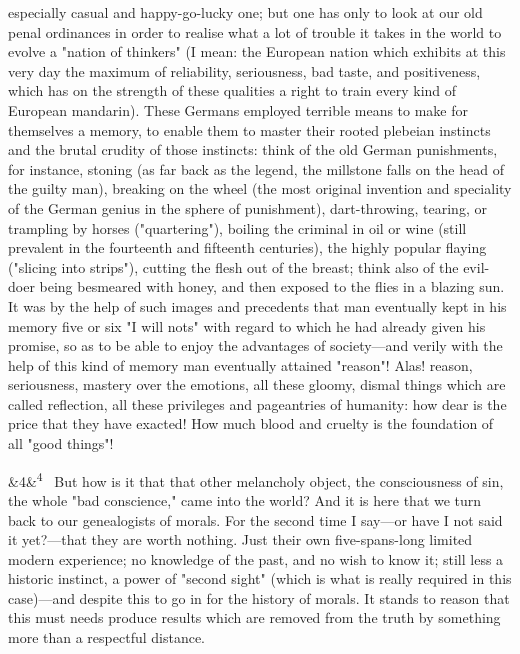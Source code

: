 \documentclass[12pt]{article}
\newcommand{\para}[1][]{\par\noindent\ifx&#1&\else\textsuperscript{\footnotesize #1}~\fi}
\begin{document}
especially casual and happy-go-lucky one; but one has only to look at our old penal ordinances in order to realise what a lot of trouble it takes in the world to evolve a "nation of thinkers" (I mean: the European nation which exhibits at this very day the maximum of reliability, seriousness, bad taste, and positiveness, which has on the strength of these qualities a right to train every kind of European mandarin). These Germans employed terrible means to make for themselves a memory, to enable them to master their rooted plebeian instincts and the brutal crudity of those instincts: think of the old German punishments, for instance, stoning (as far back as the legend, the millstone falls on the head of the guilty man), breaking on the wheel (the most original invention and speciality of the German genius in the sphere of punishment), dart-throwing, tearing, or trampling by horses ("quartering"), boiling the criminal in oil or wine (still prevalent in the fourteenth and fifteenth centuries), the highly popular flaying ("slicing into strips"), cutting the flesh out of the breast; think also of the evil-doer being besmeared with honey, and then exposed to the flies in a blazing sun. It was by the help of such images and precedents that man eventually kept in his memory five or six "I will nots" with regard to which he had already given his promise, so as to be able to enjoy the advantages of society---and verily with the help of this kind of memory man eventually attained "reason"! Alas! reason, seriousness, mastery over the emotions, all these gloomy, dismal things which are called reflection, all these privileges and pageantries of humanity: how dear is the price that they have exacted! How much blood and cruelty is the foundation of all "good things"!

\para[4] But how is it that that other melancholy object, the consciousness of sin, the whole "bad conscience," came into the world? And it is here that we turn back to our genealogists of morals. For the second time I say---or have I not said it yet?---that they are worth nothing. Just their own five-spans-long limited modern experience; no knowledge of the past, and no wish to know it; still less a historic instinct, a power of "second sight" (which is what is really required in this case)---and despite this to go in for the history of morals. It stands to reason that this must needs produce results which are removed from the truth by something more than a respectful distance.
\end{document}
